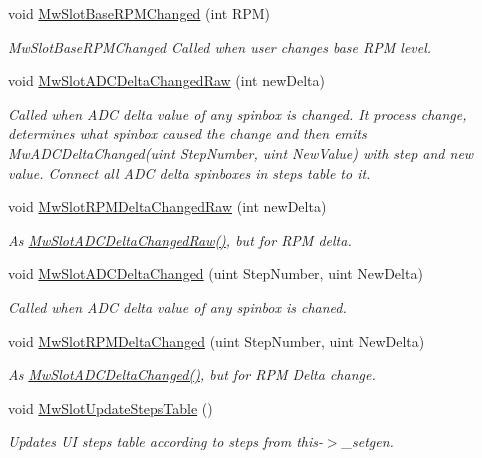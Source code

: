 \begin{DoxyCompactItemize}
void \hyperlink{class_main_window_aaf5b44955c0c93824ea89edd3cdc5730}{Mw\+Slot\+Base\+R\+P\+M\+Changed} (int R\+PM)
\begin{DoxyCompactList}\small\item\em Mw\+Slot\+Base\+R\+P\+M\+Changed Called when user changes base R\+PM level. \end{DoxyCompactList}\item 
void \hyperlink{class_main_window_acbdfd3592779f6946c4fecc33c79e9a4}{Mw\+Slot\+A\+D\+C\+Delta\+Changed\+Raw} (int new\+Delta)
\begin{DoxyCompactList}\small\item\em Called when A\+DC delta value of any spinbox is changed. It process change, determines what spinbox caused the change and then emits Mw\+A\+D\+C\+Delta\+Changed(uint Step\+Number, uint New\+Value) with step and new value. Connect all A\+DC delta spinboxes in steps table to it. \end{DoxyCompactList}\item 
void \hyperlink{class_main_window_a4480e7516f91b93c8abc3d42c1284124}{Mw\+Slot\+R\+P\+M\+Delta\+Changed\+Raw} (int new\+Delta)
\begin{DoxyCompactList}\small\item\em As \hyperlink{class_main_window_acbdfd3592779f6946c4fecc33c79e9a4}{Mw\+Slot\+A\+D\+C\+Delta\+Changed\+Raw()}, but for R\+PM delta. \end{DoxyCompactList}\item 
void \hyperlink{class_main_window_a5778840f76f8ce6edd63d84b57b801b1}{Mw\+Slot\+A\+D\+C\+Delta\+Changed} (uint Step\+Number, uint New\+Delta)
\begin{DoxyCompactList}\small\item\em Called when A\+DC delta value of any spinbox is chaned. \end{DoxyCompactList}\item 
void \hyperlink{class_main_window_a32b3a311b7151092db3ec0756d2c22d4}{Mw\+Slot\+R\+P\+M\+Delta\+Changed} (uint Step\+Number, uint New\+Delta)
\begin{DoxyCompactList}\small\item\em As \hyperlink{class_main_window_a5778840f76f8ce6edd63d84b57b801b1}{Mw\+Slot\+A\+D\+C\+Delta\+Changed()}, but for R\+PM Delta change. \end{DoxyCompactList}\item 
\mbox{\label{class_main_window_a07c8e8c9d91588bdcc8e1eae01c4ffd7}} 
void \hyperlink{class_main_window_a07c8e8c9d91588bdcc8e1eae01c4ffd7}{Mw\+Slot\+Update\+Steps\+Table} ()
\begin{DoxyCompactList}\small\item\em Updates UI steps table according to steps from this-\/$>$\+\_\+setgen. \end{DoxyCompactList}\end{DoxyCompactItemize}
